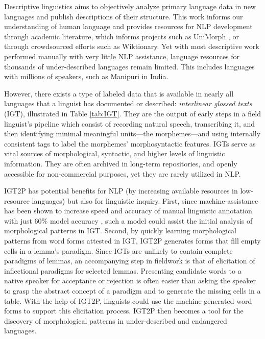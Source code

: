 Descriptive linguistics aims to objectively analyze primary language data in new languages and publish descriptions of their structure. This work informs our understanding of human language and provides resources for NLP development through academic literature, which informs projects such as UniMorph \citep{kirov_unimorph}, or through crowdsourced efforts such as Wiktionary. Yet with most descriptive work performed manually with very little NLP assistance, language resources for thousands of under-described languages remain limited. This includes languages with millions of speakers, such as Manipuri in India.

However, there exists a type of labeled data that is available in nearly all languages that a linguist has documented or described: \textit{interlinear glossed texts} (IGT), illustrated in Table \ref{tab:IGT}. They are the output of early steps in a field linguist's pipeline which consist of recording natural speech, transcribing it, and then identifying minimal meaningful units---the morphemes---and using internally consistent tags to label the morphemes' morphosyntactic features. IGTs serve as vital sources of morphological, syntactic, and higher levels of linguistic information. They are often archived in long-term repositories, and openly accessible for non-commercial purposes, yet they are rarely utilized in NLP.

IGT2P has potential benefits for NLP (by increasing available resources in low-resource languages) but also for linguistic inquiry. First, since machine-assistance has been shown to increase speed and accuracy of manual linguistic annotation with just 60\% model accuracy \citep{felt_improving_2012}, such a model could assist the initial analysis of morphological patterns in IGT. Second, by quickly learning morphological patterns from word forms attested in IGT, IGT2P generates forms that fill empty cells in a lemma's paradigm. Since IGTs are unlikely to contain complete paradigms of lemmas, an accompanying step in fieldwork is that of elicitation of inflectional paradigms for selected lemmas. Presenting candidate words to a native speaker for acceptance or rejection is often easier than asking the speaker to grasp the abstract concept of a paradigm and to generate the missing cells in a table. With the help of IGT2P, linguists could use the machine-generated word forms to support this elicitation process. IGT2P then becomes a tool for the discovery of morphological patterns in under-described and endangered languages.



